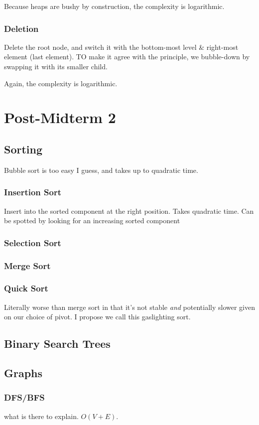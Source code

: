 \documentclass{article}
\begin{document}
Because heaps are bushy by construction, the complexity is logarithmic.

\subsubsection{Deletion}
Delete the root node, and switch it with the bottom-most level \& right-most element (last element). 
TO make it agree with the principle, we bubble-down by swapping it with its smaller child.

Again, the complexity is logarithmic.
\section{Post-Midterm 2}
\subsection{Sorting}
Bubble sort is too easy I guess, and takes up to quadratic time.
\subsubsection{Insertion Sort}
Insert into the sorted component at the right position. Takes quadratic time. Can be spotted by looking for an increasing sorted component
\subsubsection{Selection Sort}
\subsubsection{Merge Sort}
\subsubsection{Quick Sort}
Literally worse than merge sort in that it's not stable \textit{and} potentially slower given on our choice of pivot. I propose we call this gaslighting sort.
\subsection{Binary Search Trees}
\subsection{Graphs}
\subsubsection{DFS/BFS}
what is there to explain. $O(V + E)$.
\end{document}

